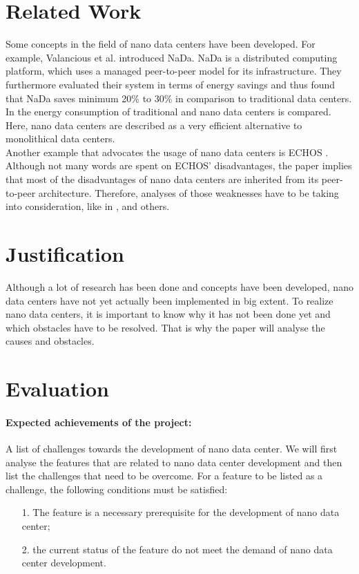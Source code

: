 \documentclass[sigchi-a, authorversion]{acmart}
\begin{document}
\section{Related Work} %
Some concepts in the field of nano data centers have been developed. For example, Valancious et al. \cite{DBLP:conf/conext/ValanciusLMDR09} introduced NaDa. NaDa is a distributed computing platform, which uses a managed peer-to-peer model for its infrastructure. They furthermore evaluated their system in terms of energy savings and thus found that NaDa saves minimum 20\% to 30\% in comparison to traditional data centers. \\
In \cite{DBLP:journals/sigmetrics/JalaliAVHAT14} the energy consumption of traditional and nano data centers is compared. Here, nano data centers are described as a very efficient alternative to monolithical data centers.\\
Another example that advocates the usage of nano data centers is ECHOS \cite{Laoutaris:2008:EEC:1341431.1341442}. Although not many words are spent on ECHOS' disadvantages, the paper implies that most of the disadvantages of nano data centers are inherited from its peer-to-peer architecture. Therefore, analyses of those weaknesses have to be taking into consideration, like in \cite{Dumitriu:2005:DoS}, \cite{Mhapasekar:2011:anonymity} and others.
\\

\section{Justification} %
Although a lot of research has been done and concepts have been developed, nano data centers have not yet actually been implemented in big extent. To realize nano data centers, it is important to know why it has not been done yet and which obstacles have to be resolved. That is why the paper will analyse the causes and obstacles.

\section{Evaluation} %

\paragraph{Expected achievements of the project:} A list of challenges towards the development of nano data center.
We will first analyse the features that are related to nano data center development and then list the challenges that need to be overcome. 
For a feature to be listed as a challenge, 
the following conditions must be satisfied:
\begin{enumerate}
\item[1.] The feature is a necessary prerequisite for the development of nano data center;
\item[2.] the current status of the feature do not meet the demand of nano data center development. 
\end{enumerate}
\end{document}
